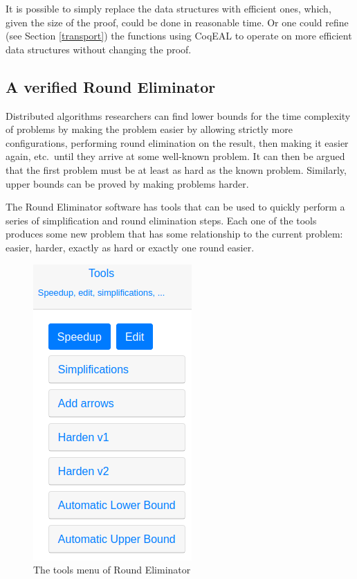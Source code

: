 \documentclass[english, 12pt, a4paper, sci, a-1b, online]{aaltothesis}
\begin{document}
It is possible to simply replace the data structures with efficient ones, which, given the size of the proof, could be done in reasonable time. Or one could refine (see Section \ref{transport}) the functions using CoqEAL to operate on more efficient data structures without changing the proof.

\subsection{A verified Round Eliminator}

Distributed algorithms researchers can find lower bounds for the time complexity of problems by making the problem easier by allowing strictly more configurations, performing round elimination on the result, then making it easier again, etc.\ until they arrive at some well-known problem. It can then be argued that the first problem must be at least as hard as the known problem. Similarly, upper bounds can be proved by making problems harder.

The Round Eliminator software has tools that can be used to quickly perform a series of simplification and round elimination steps. Each one of the tools produces some new problem that has some relationship to the current problem: easier, harder, exactly as hard or exactly one round easier.

\begin{figure}[h]
  \centering
  \includegraphics[scale=0.5]{retools}
  \caption{The tools menu of Round Eliminator}
\end{figure}
\end{document}
